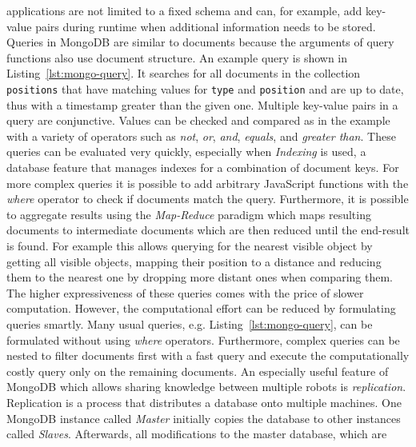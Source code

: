 \documentclass[a4paper,11pt]{article}
\newcommand{\reflst}[1]{Listing~\ref{#1}}
\begin{document}
applications are not limited to a fixed schema and can, for example,
add key-value pairs during runtime when additional information needs
to be stored.
Queries in MongoDB are similar to documents because the arguments of
query functions also use document structure. An example query is
shown in \reflst{lst:mongo-query}. It searches for all documents in
the collection \texttt{positions}
that have matching  values for \texttt{type} and \texttt{position} and
are up to date, thus with a timestamp greater than the given
one. Multiple key-value pairs in a query are conjunctive.
Values can be checked and compared as in the example
with a variety of operators such as \textit{not}, \textit{or},
\textit{and}, \textit{equals}, and \textit{greater than}. These
queries can be evaluated very quickly, especially when \emph{Indexing}
is used, a database feature that manages indexes for a combination of
document keys.
For more complex queries it is
possible to add arbitrary JavaScript functions with the \textit{where}
operator to check if documents match the query. Furthermore, it is
possible to aggregate results using the \emph{Map-Reduce} paradigm
which maps resulting documents to intermediate documents which are
then reduced until the end-result is found. For example this allows
querying for the nearest visible object by getting all visible
objects, mapping their position to a distance and reducing them to the
nearest one by dropping more distant ones when comparing them.  The
higher expressiveness of these queries comes with the price of slower
computation. However, the computational effort can be reduced by
formulating queries smartly. Many usual queries,
e.g. \reflst{lst:mongo-query}, can be formulated without using
\textit{where} operators. Furthermore, complex queries can be nested
to filter documents first with a fast query and execute the
computationally costly query only on the remaining documents.
%
An especially useful feature of MongoDB which allows sharing knowledge
between multiple robots is \emph{replication}. Replication is a
process that distributes a database onto multiple machines.
One MongoDB instance called \emph{Master} initially
copies the database  to other instances called \emph{Slaves}.
Afterwards, all modifications to the master database, which are
\end{document}
